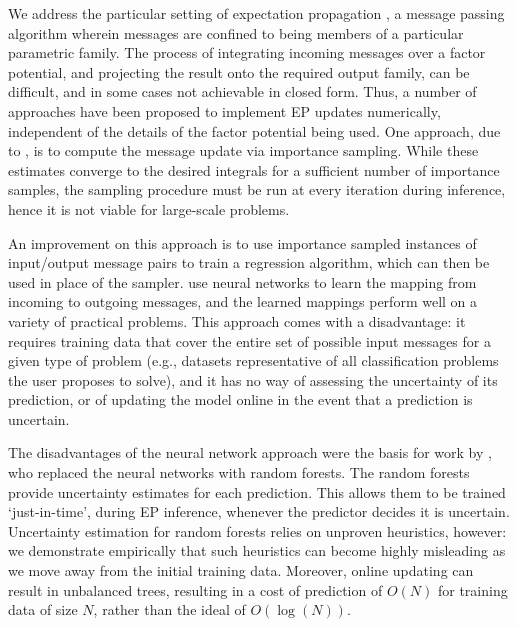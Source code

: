 \documentclass[english]{article}
\theoremstyle{plain}
\theoremstyle{plain}
\begin{document}
We address the particular setting of expectation propagation \citep{Minka2001}, a message
passing algorithm wherein messages are confined to being members of a particular parametric
family. The process of integrating incoming messages over a factor potential, and projecting the result onto the
required output family, can be difficult, and in some cases not achievable in closed form.
Thus, a number of approaches have been proposed to implement EP updates numerically, independent
of the details of the factor potential being used.  One approach, due to
\citet{Barthelme2011}, is to compute the message update via importance sampling.
While these estimates converge to the desired integrals for a sufficient number of importance samples, the sampling procedure must be run at every iteration during inference,
hence  it is not viable for large-scale problems.

An improvement on this approach is to use importance sampled instances of input/output
message pairs to train a regression algorithm, which can then be used in place of the sampler.
\citet{Heess2013} use neural networks to learn the mapping from incoming
to outgoing messages, and the learned mappings perform well on a variety of practical problems.
This approach comes with a disadvantage: it requires training data
that cover the entire set of possible input messages for a given type of problem (e.g., datasets
representative of all classification problems the user proposes to solve),
and it has no way of assessing the uncertainty of its prediction, or of updating
the model online in the event that a prediction is uncertain.


The disadvantages of the neural network approach were the basis for work by
\cite{Eslami2014}, who replaced the neural networks with random forests.
The random forests  provide uncertainty estimates for each prediction. This allows them to be trained `just-in-time', during EP inference, whenever the predictor decides it is uncertain.
Uncertainty estimation for random forests relies on unproven heuristics, however: we demonstrate
empirically that such heuristics can become highly misleading as we move away from the initial
training data.
Moreover,  online updating
can result in unbalanced trees, resulting in a cost of prediction of $O(N)$ for training data of size $N$, rather than the ideal of $O(\log(N))$.


\end{document}
